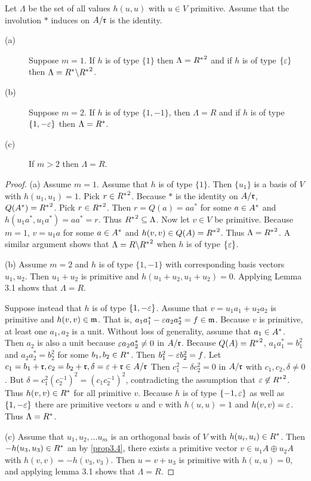 \begin{lemma}\label{lemma3.7}
Let $\Lambda$ be the set of all values $h(u,u)$ with $u \in V$ primitive.
Assume that the involution $*$ induces on $A/\mathfrak{r}$ is the identity.
\begin{description}
\item[(a)] Suppose $m=1$. If $h$ is of type $\{1\}$ then $\Lambda = {R^*}^2$ and if $h$ is of type $\{\varepsilon\}$ then $\Lambda = R^* \backslash {R^*}^2$.
\item[(b)] Suppose $m=2$. If $h$ is of type $\{1, -1\}$, then $\Lambda = R$ and if $h$ is of type $\{1, - \varepsilon\}$ then $\Lambda = R^*$.
\item[(c)] If $m > 2$ then $\Lambda = R$.
\end{description}
\end{lemma}

\begin{proof}
(a) Assume $m=1$.
Assume that $h$ is of type $\{1\}$.
Then $\{u_1\}$ is a basis of $V$ with $h(u_1, u_1) = 1$. Pick $r \in {R^*}^2$. Because $*$ is the identity on $A / \mathfrak{r}$, $Q(A^*) = {R^*}^2$.
Pick $r \in {R^*}^2$.
Then $r = Q(a) = a a^*$ for some $a \in A^*$ and $h(u_1 a^*, u_1 a^*) = aa^* = r$.
Thus ${R^*}^2 \subseteq \Lambda$.
Now let $v \in V$ be primitive.
Because $m=1$, $v = u_1 a$ for some $a \in A^*$ and $h(v, v) \in Q(A) = {R^*}^2$.
Thus $\Lambda = {R^*}^2$.
A similar argument shows that $\Lambda = R \backslash {R^*}^2$ when $h$ is of type $\{\varepsilon\}$.

(b) Assume $m = 2$ and $h$ is of type $\{1, -1\}$ with corresponding basis vectors $u_1, u_2$.
Then $u_1 + u_2$ is primitive and $h(u_1 + u_2, u_1 + u_2) = 0$.
Applying Lemma 3.1 shows that $\Lambda = R$.

Suppose instead that $h$ is of type $\{1, -\varepsilon\}$.
Assume that $v = u_1 a_1 + u_2 a_2$ is primitive and $h(v,v) \in \mathfrak{m}$.
That is, $a_1 a_1^* - \varepsilon a_2 a_2^* = f \in \mathfrak{m}$.
Because $v$ is primitive, at least one $a_1, a_2$ is a unit.
Without loss of generality, assume that $a_1 \in A^*$.
Then $a_2$ is also a unit because $\varepsilon a_2 a_2^* \ne 0$ in $A / \mathfrak{r}$.
Because $Q(A) = {R^*}^2$, $a_1 a_1^* = b_1^2$ and $a_2 a_2^* = b_2^2$ for some $b_1, b_2 \in R^*$. 
Then $b_1^2 - \varepsilon b_2^2 = f$. 
Let $c_1 = b_1 + \mathfrak{r}, c_2 = b_2 + \mathfrak{r}, \delta = \varepsilon + \mathfrak{r} \in A/\mathfrak{r}$
Then $c_1^2 - \delta c_2^2 = 0$ in $A / \mathfrak{r}$ with $c_1, c_2, \delta \ne 0$.
But $\delta = c_1^2 (c_2^{-1})^2 = (c_1 c_2^{-1})^2$, contradicting the assumption that $\varepsilon \not\in {R^*}^2$.
Thus $h(v,v) \in R^*$ for all primitive $v$.
Because $h$ is of type $\{-1, \varepsilon \}$ as well as $\{1, -\varepsilon\}$ there are primitive vectors $u$ and $v$ with $h(u,u) = 1$ and $h(v,v) = \varepsilon$.
Thus $\Lambda = R^*$.

(c) Assume that $u_1, u_2, \dotsc u_m$ is an orthogonal basis of $V$ with $h(u_i, u_i) \in R^*$.
Then $-h(u_3, u_3) \in R^*$ an by \cref{prop3.4}, there exists a primitive vector $v \in u_1 A \oplus u_2 A$ with $h(v,v) = -h(v_3, v_3)$.
Then $u = v + u_3$ is primitive with $h(u,u) = 0$, and applying lemma 3.1 shows that $\Lambda = R$.
\end{proof}

